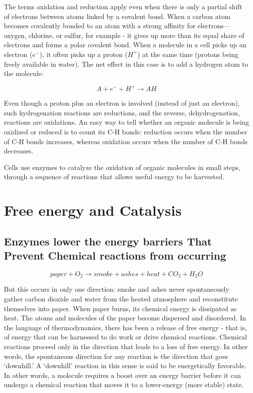 The terms oxidation and reduction apply even when there is only a partial
shift of electrons between atoms linked by a covalent bond. When a
carbon atom becomes covalently bonded to an atom with a strong affinity
for electrons—oxygen, chlorine, or sulfur, for example - it gives up more
than its equal share of electrons and forms a polar covalent bond.
When a molecule in a cell picks up an electron ($e^{-}$), it often picks up a
proton ($H^{+}$) at the same time (protons being freely available in water).
The net effect in this case is to add a hydrogen atom to the molecule:

\begin{equation}
A + e^{-} +  H^{+} \rightarrow AH
\end{equation}

Even though a proton plus an electron is involved (instead of just an
electron), such hydrogenation reactions are reductions, and the reverse,
dehydrogenation, reactions are oxidations. An easy way to tell whether an
organic molecule is being oxidized or reduced is to count its C-H bonds:
reduction occurs when the number of C-H bonds increases, whereas oxidation
occurs when the number of C-H bonds decreases.

Cells use enzymes to catalyze the oxidation of organic molecules in small steps,
through a sequence of reactions that allows useful energy to be harvested.

\section{Free energy and Catalysis}

\subsection{Enzymes lower the energy barriers That Prevent Chemical reactions from occurring}

\begin{equation}
paper + O_{2} \rightarrow smoke + ashes + heat + CO_{2} + H_{2}O
\end{equation}

But this occurs in only one direction: smoke and ashes never spontaneously
gather carbon dioxide and water from the heated atmosphere and
reconstitute themselves into paper. When paper burns, its chemical
energy is dissipated as heat. The atoms
and molecules of the paper become dispersed and disordered. In the
language of thermodynamics, there has been a release of free energy -
that is, of energy that can be harnessed to do work or drive chemical
reactions. Chemical reactions proceed only in the direction that leads to
a loss of free energy. In other words, the spontaneous direction for any
reaction is the direction that goes ‘downhill.’ A ‘downhill’ reaction in this
sense is said to be energetically favorable.
In other words, a molecule requires a boost over an energy barrier
before it can undergo a chemical reaction that moves it to a lower-energy
(more stable) state.

